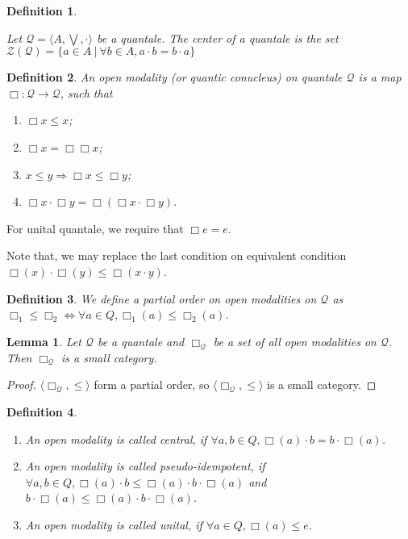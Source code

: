 \documentclass[a4paper]{article}
\theoremstyle{defin}
\newtheorem{defin}{Definition}
\theoremstyle{theorem}
\theoremstyle{prop}
\theoremstyle{lemma}
\newtheorem{lemma}{Lemma}
\theoremstyle{ex}
\theoremstyle{col}
\begin{document}
\begin{defin}
$ $

  Let $\mathcal{Q} = \langle A, \bigvee, \cdot \rangle$ be a quantale. The center of a quantale is the set $\mathcal{Z}(\mathcal{Q}) = \{ a \in A \: | \: \forall b \in A, a \cdot b = b \cdot a \}$
\end{defin}

\begin{defin} An open modality (or quantic conucleus) on quantale $\mathcal{Q}$ is a map $\Box : \mathcal{Q} \to \mathcal{Q}$, such that

\begin{enumerate}
  \item $\Box x \leq x$;
  \item $\Box x = \Box \Box x$;
  \item $x \leq y \Rightarrow \Box x \leq \Box y$;
  \item $\Box x \cdot \Box y = \Box (\Box x \cdot \Box y)$.
\end{enumerate}
\end{defin}

For unital quantale, we require that $\Box e = e$.

Note that, we may replace the last condition on equivalent condition $\Box (x) \cdot \Box (y) \leq \Box (x \cdot y)$.

\begin{defin}
  We define a partial order on open modalities on $\mathcal{Q}$ as $\Box_1 \leq \Box_2 \Leftrightarrow \forall a \in Q, \Box_1 (a) \leq \Box_2 (a)$.
\end{defin}

\begin{lemma}
  Let $\mathcal{Q}$ be a quantale and $\Box_{\mathcal{Q}}$ be a set of all open modalities on $\mathcal{Q}$.
  Then $\Box_{\mathcal{Q}}$ is a small category.
\end{lemma}

\begin{proof}
  $\langle \Box_{\mathcal{Q}}, \leq \rangle$ form a partial order, so $\langle \Box_{\mathcal{Q}}, \leq \rangle$ is a small category.
\end{proof}

\begin{defin}
$ $
\begin{enumerate}
  \item An open modality is called central, if $\forall a, b \in Q, \Box(a) \cdot b = b \cdot \Box(a)$.

  \item An open modality is called pseudo-idempotent, if $\forall a, b \in Q, \Box(a) \cdot b \leq \Box(a) \cdot b \cdot \Box(a)$ and
  $b \cdot \Box(a) \leq \Box(a) \cdot b \cdot \Box(a)$.

  \item An open modality is called unital, if $\forall a \in Q, \Box(a) \leq e$.
\end{enumerate}
\end{defin}
\end{document}
